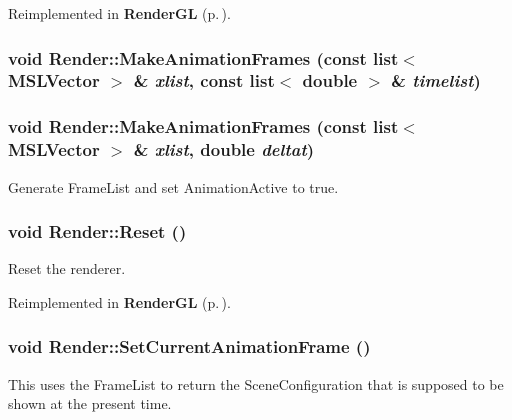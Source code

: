 Reimplemented in {\bf Render\-GL} {\rm (p.\,\pageref{classRenderGL_a6})}.
\subsubsection{\setlength{\rightskip}{0pt plus 5cm}void Render::Make\-Animation\-Frames (const list$<$ {\bf MSLVector} $>$ \& {\em xlist}, const list$<$ double $>$ \& {\em timelist})\hspace{0.3cm}{\tt  [virtual]}}\label{classRender_a11}


\subsubsection{\setlength{\rightskip}{0pt plus 5cm}void Render::Make\-Animation\-Frames (const list$<$ {\bf MSLVector} $>$ \& {\em xlist}, double {\em deltat})\hspace{0.3cm}{\tt  [virtual]}}\label{classRender_a10}


Generate Frame\-List and set Animation\-Active to true.

\subsubsection{\setlength{\rightskip}{0pt plus 5cm}void Render::Reset ()\hspace{0.3cm}{\tt  [virtual]}}\label{classRender_a7}


Reset the renderer.



Reimplemented in {\bf Render\-GL} {\rm (p.\,\pageref{classRenderGL_a4})}.
\subsubsection{\setlength{\rightskip}{0pt plus 5cm}void Render::Set\-Current\-Animation\-Frame ()\hspace{0.3cm}{\tt  [protected, virtual]}}\label{classRender_b0}


This uses the Frame\-List to return the Scene\-Configuration that is supposed to be shown at the present time.


